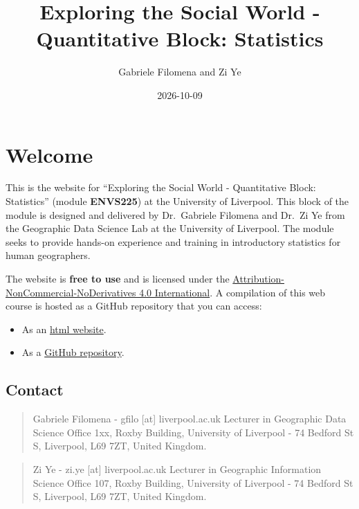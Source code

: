 \documentclass[
  letterpaper,
  DIV=11,
  numbers=noendperiod]{scrreprt}
\title{Exploring the Social World - Quantitative Block: Statistics}
\author{Gabriele Filomena and Zi Ye}
\date{2026-10-09}
\providecommand{\tightlist}{%
  \setlength{\itemsep}{0pt}\setlength{\parskip}{0pt}}
\renewcommand*\contentsname{Table of contents}
\newcommand\contentsname{Table of contents}
\begin{document}
\maketitle

\renewcommand*\contentsname{Table of contents}
{
\setcounter{tocdepth}{2}
\tableofcontents
}


\chapter*{Welcome}\label{welcome}


This is the website for ``Exploring the Social World - Quantitative
Block: Statistics'' (module \textbf{ENVS225}) at the University of
Liverpool. This block of the module is designed and delivered by
Dr.~Gabriele Filomena and Dr.~Zi Ye from the Geographic Data Science Lab
at the University of Liverpool. The module seeks to provide hands-on
experience and training in introductory statistics for human
geographers.

The website is \textbf{free to use} and is licensed under the
\href{https://creativecommons.org/licenses/by-nc-nd/4.0/}{Attribution-NonCommercial-NoDerivatives
4.0 International}. A compilation of this web course is hosted as a
GitHub repository that you can access:

\begin{itemize}
\tightlist
\item
  As an \href{https://gdsl-ul.github.io/stats}{html website}.
\item
  As a \href{https://github.com/GDSL-UL/stats}{GitHub repository}.
\end{itemize}

\section*{Contact}\label{contact}


\begin{quote}
Gabriele Filomena - gfilo {[}at{]} liverpool.ac.uk Lecturer in
Geographic Data Science Office 1xx, Roxby Building, University of
Liverpool - 74 Bedford St S, Liverpool, L69 7ZT, United Kingdom.
\end{quote}

\begin{quote}
Zi Ye - zi.ye {[}at{]} liverpool.ac.uk Lecturer in Geographic
Information Science Office 107, Roxby Building, University of Liverpool
- 74 Bedford St S, Liverpool, L69 7ZT, United Kingdom.
\end{quote}
\end{document}
